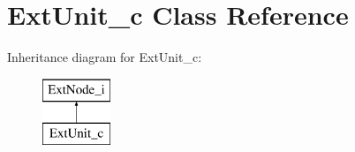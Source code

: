 \hypertarget{classExtUnit__c}{\section{Ext\-Unit\-\_\-c Class Reference}
\label{classExtUnit__c}
}
Inheritance diagram for Ext\-Unit\-\_\-c\-:\begin{figure}[H]
\begin{center}
\leavevmode
\includegraphics[height=2.000000cm]{classExtUnit__c}
\end{center}
\end{figure}
